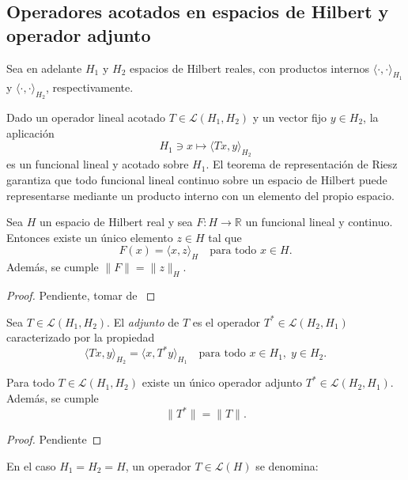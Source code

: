 \subsection{Operadores acotados en espacios de Hilbert y operador adjunto}

Sea en adelante $H_{1}$ y $H_{2}$ espacios de Hilbert reales, con productos internos $\langle \cdot,\cdot \rangle_{H_{1}}$ y $\langle \cdot,\cdot \rangle_{H_{2}}$, respectivamente.

Dado un operador lineal acotado $T \in \mathcal{L}(H_{1},H_{2})$ y un vector fijo $y \in H_{2}$, la aplicación
\[
H_{1} \ni x \longmapsto \langle T x, y \rangle_{H_{2}}
\]
es un funcional lineal y acotado sobre $H_{1}$. El teorema de representación de Riesz garantiza que todo funcional lineal continuo sobre un espacio de Hilbert puede representarse mediante un producto interno con un elemento del propio espacio.

\begin{theorem}
Sea $H$ un espacio de Hilbert real y sea $F : H \to \mathbb{R}$ un funcional lineal y continuo. Entonces existe un único elemento $z \in H$ tal que
\[
F(x) = \langle x,z \rangle_{H} \quad \text{para todo } x \in H.
\]
Además, se cumple $\|F\| = \|z\|_{H}$.
\end{theorem}

\begin{proof}
    Pendiente, tomar de \cite{rynne_youngson2000}
\end{proof}

\begin{definition}
Sea $T \in \mathcal{L}(H_{1},H_{2})$. El \emph{adjunto} de $T$ es el operador $T^{*} \in \mathcal{L}(H_{2},H_{1})$ caracterizado por la propiedad
\[
\langle T x, y \rangle_{H_{2}} = \langle x, T^{*} y \rangle_{H_{1}}
\quad \text{para todo } x \in H_{1}, \; y \in H_{2}.
\]
\end{definition}

\begin{proposition}
Para todo $T \in \mathcal{L}(H_{1},H_{2})$ existe un único operador adjunto $T^{*} \in \mathcal{L}(H_{2},H_{1})$. Además, se cumple
\[
\|T^{*}\| = \|T\|.
\]
\end{proposition}

\begin{proof}
Pendiente
\end{proof}

En el caso $H_{1} = H_{2} = H$, un operador $T \in \mathcal{L}(H)$ se denomina:

